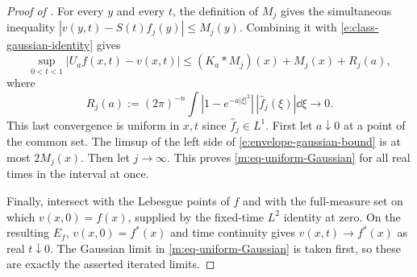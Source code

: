 \begin{proof}[Proof of ]
For every $y$ and every $t$, the definition of $M_j$ gives the
simultaneous inequality $|v(y,t)-S(t)f_j(y)|\le M_j(y)$.
Combining it with \eqref{e:class-gaussian-identity} gives
\begin{equation}
 \sup_{0<t<1}|U_a f(x,t)-v(x,t)|
 \le (K_a*M_j)(x)+M_j(x)+R_j(a),
 \label{e:envelope-gaussian-bound}
\end{equation}
where
\[
 R_j(a):=(2\pi)^{-n}
     \int |1-e^{-a|\xi|^2}|\,|\widehat f_j(\xi)|\dd\xi
       \longrightarrow0.
\]
This last convergence is uniform in $x,t$ since
$\widehat f_j\in L^1$.  First let $a\downarrow0$ at a point of the
common set.  The limsup of the left side of
\eqref{e:envelope-gaussian-bound} is at most $2M_j(x)$.
Then let $j\to\infty$.  This proves
\eqref{m:eq-uniform-Gaussian} for all real times in the interval
at once.

Finally, intersect with the Lebesgue points of $f$ and with the
full-measure set on which $v(x,0)=f(x)$, supplied by the fixed-time
$L^2$ identity at zero.  On the resulting $E_f$,
$v(x,0)=f^*(x)$ and time continuity gives
$v(x,t)\to f^*(x)$ as real $t\downarrow0$.
The Gaussian limit in \eqref{m:eq-uniform-Gaussian} is taken first,
so these are exactly the asserted iterated limits.
\end{proof}
